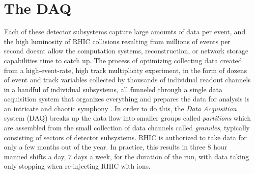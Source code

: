 \section{The DAQ}
Each of these detector subsystems capture large amounts of data per event, and the high luminosity of RHIC collisions resulting from millions of events per second doesnt allow the computation systems, reconstruction, or network storage capabilities time to catch up. The process of optimizing collecting data created from a high-event-rate, high track multiplicity experiment, in the form of dozens of event and track variables collected by thousands of individual readout channels in a handful of individual subsystems, all funneled through a single data acquisition system that organizes everything and prepares the data for analysis is an intricate and chaotic symphony \citep{DAQfocus}. In order to do this, the \textit{Data Acquisition} system (DAQ) breaks up the data flow into smaller groups called \textit{partitions} which are assembled from the small collection of data channels called \textit{granules}, typically consisting of sectors of detector subsystems. RHIC is authorized to take data for only a few months out of the year. In practice, this results in three 8 hour manned shifts a day, 7 days a week, for the duration of the run, with data taking only stopping when re-injecting RHIC with ions.

